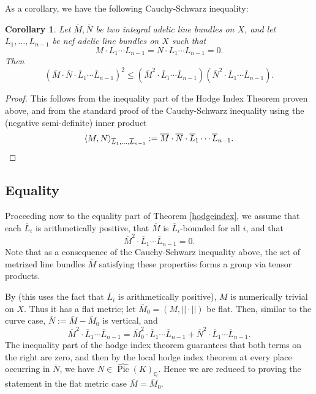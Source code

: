 \documentclass[times, doublespace]{amsart}
\numberwithin{equation}{section}
\theoremstyle{plain}
\newtheorem{cor}[equation]{Corollary}
\theoremstyle{definition}
\DeclareMathOperator{\Pic}{Pic}
\newcommand{\Q}{\mathbb{Q}}
\begin{document}
As a corollary, we have the following Cauchy-Schwarz inequality:

\begin{cor}\label{cauchyschwarz}
Let $\overline M,\overline N$ be two integral adelic line bundles on $X$, and let $\overline L_1,\dots,\overline L_{n-1}$ be nef adelic line bundles on $X$ such that
\[M\cdot L_1\cdots L_{n-1}=N\cdot L_1\cdots L_{n-1}=0.\]
Then
\[\left(\overline M\cdot\overline N\cdot \overline L_1\cdots\overline L_{n-1}\right)^2\le\left(\overline M^2\cdot \overline L_1\cdots\overline L_{n-1}\right)\left(\overline N^2\cdot \overline L_1\cdots\overline L_{n-1}\right).\]
\end{cor}
\begin{proof}
This follows from the inequality part of the Hodge Index Theorem proven above, and from the standard proof of the Cauchy-Schwarz inequality using the (negative semi-definite) inner product
\begin{equation*}\langle M,N\rangle_{\overline L_1,\dots,\overline L_{n-1}}:=\overline M\cdot\overline N\cdot \overline L_1\cdots\overline L_{n-1}.\qedhere\end{equation*}
\end{proof}


\subsection{Equality}
Proceeding now to the equality part of Theorem \ref{hodgeindex}, we assume that each $\overline L_i$ is arithmetically positive, that $\overline M$ is $\overline L_i$-bounded for all $i$, and that
\[\overline M^2\cdot \overline L_1\cdots\overline L_{n-1}=0.\] 
Note that as a consequence of the Cauchy-Schwarz inequality above, the set of metrized line bundles $\overline M$ satisfying these properties forms a group via tensor products.


By \cite[Lemma 3.7]{yz} (this uses the fact that $\overline L_i$ is arithmetically positive), $M$ is numerically trivial on $X$. Thus it has a flat metric; let $\overline M_0=(M,||\cdot||)$ be flat. Then, similar to the curve case, $\overline N:=\overline M-\overline M_0$ is vertical, and 
\[\overline M^2\cdot \overline L_1\cdots\overline L_{n-1}=\overline M_0^2\cdot \overline L_1\cdots\overline L_{n-1}+\overline N^2\cdot \overline L_1\cdots\overline L_{n-1}.\]
The inequality part of the hodge index theorem guarantees that both terms on the right are zero, and then by the local hodge index theorem at every place occurring in $\overline N$, we have $\overline N\in\widehat{\Pic}(K)_{\Q}$. Hence we are reduced to proving the statement in the flat metric case $\overline M=\overline M_0$.
\end{document}
